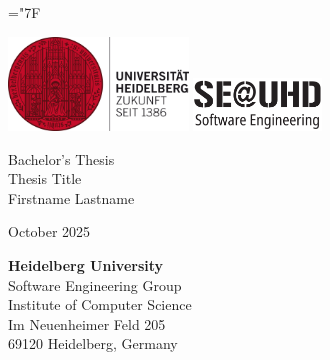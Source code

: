 \documentclass[
    pdftex,
    final,
    11pt,
    a4paper,
    parskip=false, %
    twoside, %
    footheight=0mm, %
    footinclude=false,
    toc=bibliography, %
    toc=listof %
]{scrbook} %
\newcommand{\thesistype}{Bachelor's Thesis} %
\newcommand{\thesistitle}{Thesis Title}
\newcommand{\studentname}{Firstname Lastname}
\newcommand{\monthyear}{October 2025}
\begin{document}
\hyphenchar\font=\string"7F %

\frontmatter %

\begin{titlepage}

	\begin{center}
		\includegraphics[height=2.5cm]{figures/logos/hd_logo_standard_16cm_rgb.png}	
		\hfill
		\includegraphics[height=1.4cm]{figures/logos/se-uhd-logo.png}	
	\end{center}
	
	\vspace{5cm}
	
	\begin{center}
		{\large \thesistype}\\
		\vspace{1\baselineskip}
		{\LARGE\textsf{\thesistitle}}\\
		\vspace{2\baselineskip}
		{\large \studentname}\\
	\end{center}

	\vfill
		
	\begin{center}
		{\large \monthyear}
	\end{center}

\end{titlepage}

\newpage
\thispagestyle{empty}
\mbox{}
\newpage

\thispagestyle{empty}
	
\begin{center}
	{\large\bfseries Heidelberg University}\\
	\vspace{5pt}
	Software Engineering Group\\
	Institute of Computer Science\\
    Im Neuenheimer Feld 205\\
    69120 Heidelberg, Germany
\end{center}
	
\end{document}
